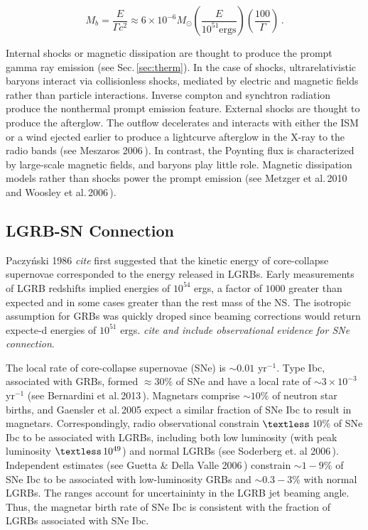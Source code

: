 \documentclass{article}
\begin{document}
\begin{equation}
M_{b} = \frac{E}{\Gamma c^2} \approx 6 \times 10^{-6} M_{\odot} \left(\frac{E}{10^{51} \mathrm{ergs}}\right) \left(\frac{100}{\Gamma}\right)\,.
\end{equation}

Internal shocks or magnetic dissipation are thought to produce the prompt gamma ray emission (see Sec.\,\ref{sec:therm}). In the case of shocks, ultrarelativistic baryons interact via collisionless shocks, mediated by electric and magnetic fields rather than particle interactions. Inverse compton and synchtron radiation produce the nonthermal prompt emission feature. External shocks are thought to produce the afterglow. The outflow decelerates and interacts with either the ISM or a wind ejected earlier to produce a lightcurve afterglow in the X-ray to the radio bands (see Meszaros 2006\,\cite{Meszaros:2006rc}). In contrast, the Poynting flux is characterized by large-scale magnetic fields, and baryons play little role. Magnetic dissipation models rather than shocks power the prompt emission (see Metzger et al.\,2010\,\cite{Metzger:2010pp} and Woosley et al.\,2006\,\cite{Woosley:2006fn}).

\subsection{LGRB-SN Connection}

Paczy\'nski 1986 \textit{cite} first suggested that the kinetic energy of core-collapse supernovae corresponded to the energy released in LGRBs. Early measurements of LGRB redshifts implied energies of $10^{54}$ ergs, a factor of $1000$ greater than expected and in some cases greater than the rest mass of the NS. The isotropic assumption for GRBs was quickly droped since beaming corrections would return expecte-d energies of $10^{51}$ ergs. \textit{cite and include observational evidence for SNe connection}.

The local rate of core-collapse supernovae (SNe) is $\sim 0.01$ yr$^{-1}$. Type Ibc, associated with GRBs, formed $\approx 30\%$ of SNe and have a local rate of $\sim 3 \times 10^{-3}$ yr$^{-1}$ (see Bernardini et al.\,2013\,\cite{Bernardini:2013nfa}). Magnetars comprise $\sim 10\%$ of neutron star births, and Gaensler et al.\,2005 \cite{Gaensler:2005qk} expect a similar fraction of SNe Ibc to result in magnetars. Correspondingly, radio observational constrain $\textless$\,$10\%$ of SNe Ibc to be associated with LGRBs, including both low luminosity (with peak luminosity $\textless\,10^{49}$) and normal LGRBs (see Soderberg et. al 2006\,\cite{Soderberg:2006vh}). Independent estimates (see Guetta \& Della Valle 2006\,\cite{Guetta:2006gq}) constrain $\sim 1-9\%$ of SNe Ibc to be associated with low-luminosity GRBs and $\sim 0.3-3\%$ with normal LGRBs. The ranges account for uncertaininty in the LGRB jet beaming angle. Thus, the magnetar birth rate of SNe Ibc is consistent with the fraction of LGRBs associated with SNe Ibc.
\end{document}
